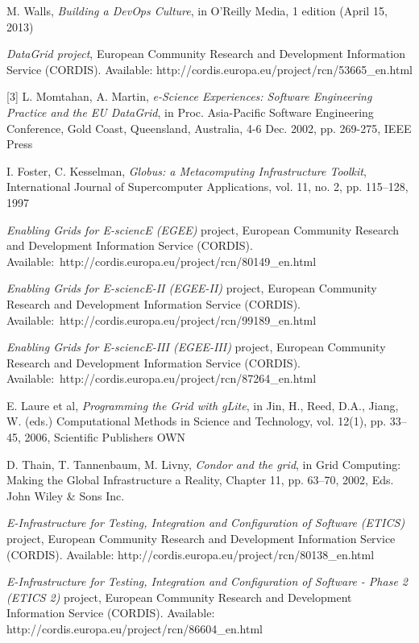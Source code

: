 \documentclass[journal]{IEEEtran}
\begin{document}
\begin{thebibliography}{1}

M. Walls, \emph{Building a DevOps Culture}, in O'Reilly Media, 1 edition (April 15, 2013)

\emph{DataGrid project}, European Community Research and Development Information Service (CORDIS). Available: http://cordis.europa.eu/project/rcn/53665\_en.html

[3] L. Momtahan, A. Martin, \emph{e-Science Experiences: Software Engineering Practice and the EU DataGrid}, in Proc. Asia-Pacific Software Engineering Conference, Gold Coast, Queensland, Australia, 4-6 Dec. 2002, pp. 269-275, IEEE Press

I. Foster, C. Kesselman, \emph{Globus: a Metacomputing Infrastructure Toolkit}, International Journal of Supercomputer Applications, vol. 11, no. 2, pp. 115–128, 1997

\emph{Enabling Grids for E-sciencE (EGEE)} project, European Community Research and Development Information Service (CORDIS). Available: http://cordis.europa.eu/project/rcn/80149\_en.html

\emph{Enabling Grids for E-sciencE-II (EGEE-II)} project, European Community Research and Development Information Service (CORDIS). Available: http://cordis.europa.eu/project/rcn/99189\_en.html

\emph{Enabling Grids for E-sciencE-III (EGEE-III)} project, European Community Research and Development Information Service (CORDIS). Available: http://cordis.europa.eu/project/rcn/87264\_en.html

E. Laure et al, \emph{Programming the Grid with gLite}, in Jin, H., Reed, D.A., Jiang, W. (eds.) Computational Methods in Science and Technology, vol. 12(1), pp. 33–45, 2006, Scientific Publishers OWN

D. Thain, T. Tannenbaum, M. Livny, \emph{Condor and the grid}, in Grid Computing: Making the Global Infrastructure a Reality, Chapter 11, pp. 63–70, 2002, Eds. John Wiley \& Sons Inc.

\emph{E-Infrastructure for Testing, Integration and Configuration of Software (ETICS)} project, European Community Research and Development Information Service (CORDIS). Available: http://cordis.europa.eu/project/rcn/80138\_en.html

\emph{E-Infrastructure for Testing, Integration and Configuration of Software - Phase 2 (ETICS 2)} project, European Community Research and Development Information Service (CORDIS). Available: http://cordis.europa.eu/project/rcn/86604\_en.html


\end{thebibliography}
\end{document}
